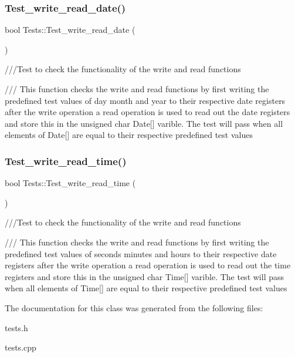 \subsubsection{\texorpdfstring{Test\+\_\+write\+\_\+read\+\_\+date()}{Test\_write\_read\_date()}}
{\footnotesize\ttfamily bool Tests\+::\+Test\+\_\+write\+\_\+read\+\_\+date (\begin{DoxyParamCaption}{ }\end{DoxyParamCaption})}



///\+Test to check the functionality of the write and read functions 

/// This function checks the write and read functions by first writing the predefined test values of day month and year to their respective date registers after the write operation a read operation is used to read out the date registers and store this in the unsigned char Date\mbox{[}\mbox{]} varible. The test will pass when all elements of Date\mbox{[}\mbox{]} are equal to their respective predefined test values \mbox{\label{classTests_ab5122391e15bf4a8dda6dac97aeb39b2}} 
\subsubsection{\texorpdfstring{Test\+\_\+write\+\_\+read\+\_\+time()}{Test\_write\_read\_time()}}
{\footnotesize\ttfamily bool Tests\+::\+Test\+\_\+write\+\_\+read\+\_\+time (\begin{DoxyParamCaption}{ }\end{DoxyParamCaption})}



///\+Test to check the functionality of the write and read functions 

/// This function checks the write and read functions by first writing the predefined test values of seconds minutes and hours to their respective date registers after the write operation a read operation is used to read out the time registers and store this in the unsigned char Time\mbox{[}\mbox{]} varible. The test will pass when all elements of Time\mbox{[}\mbox{]} are equal to their respective predefined test values 

The documentation for this class was generated from the following files\+:\begin{DoxyCompactItemize}
\item 
tests.\+h\item 
tests.\+cpp\end{DoxyCompactItemize}
